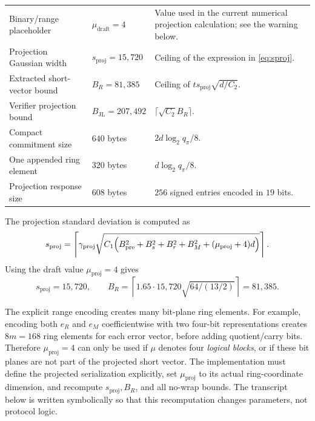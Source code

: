 \documentclass[11pt,a4paper]{article}
\newcommand{\proofmod}{q_{\pi}}
\begin{document}
\begin{longtable}{@{}p{}p{}p{}@{}}
Binary/range placeholder & \(\mu_{\mathrm{draft}}=4\) & Value used in the current numerical projection calculation; see the warning below. \\
Projection Gaussian width & \(s_{\mathrm{proj}}=15{,}720\) & Ceiling of the expression in \cref{eq:sproj}. \\
Extracted short-vector bound & \(B_R=81{,}385\) & Ceiling of \(t s_{\mathrm{proj}}\sqrt{d/C_2}\). \\
Verifier projection bound & \(B_{\mathrm{JL}}=207{,}492\) & \(\lceil\sqrt{C_2}B_R\rceil\). \\
Compact commitment size & \(640\) bytes & \(2d\log_2\proofmod/8\). \\
One appended ring element & \(320\) bytes & \(d\log_2\proofmod/8\). \\
Projection response size & \(608\) bytes & \(256\) signed entries encoded in \(19\) bits. \\
\bottomrule
\end{longtable}

The projection standard deviation is computed as
\begin{equation}
  s_{\mathrm{proj}}
  =\left\lceil
  \gamma_{\mathrm{proj}}
  \sqrt{C_1\Bigl(
     B_{\mathrm{pre}}^2+B_s^2+B_r^2+B_M^2
     +(\mu_{\mathrm{proj}}+4)d
  \Bigr)}
  \right\rceil.
  \label{eq:sproj}
\end{equation}
Using the draft value \(\mu_{\mathrm{proj}}=4\) gives
\[
  s_{\mathrm{proj}}=15{,}720,
  \qquad
  B_R=\left\lceil1.65\cdot15{,}720\sqrt{64/(13/2)}\right\rceil
  =81{,}385.
\]

\begin{importantbox}[The value \(\mu_{\mathrm{draft}}=4\) is not a complete serialization count]
The explicit range encoding creates many bit-plane ring elements.  For example,
encoding both \(e_R\) and \(e_M\) coefficientwise with two four-bit
representations creates \(8m=168\) ring elements for each error vector, before
adding quotient/carry bits.  Therefore \(\mu_{\mathrm{proj}}=4\) can only be
used if \(\mu\) denotes four \emph{logical blocks}, or if these bit planes are
not part of the projected short vector.  The implementation must define the
projected serialization explicitly, set \(\mu_{\mathrm{proj}}\) to its actual
ring-coordinate dimension, and recompute \(s_{\mathrm{proj}},B_R\), and all
no-wrap bounds.  The transcript below is written symbolically so that this
recomputation changes parameters, not protocol logic.
\end{importantbox}
\end{document}
